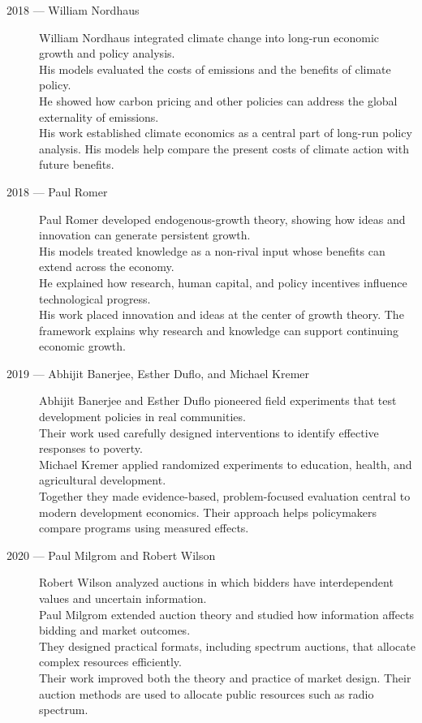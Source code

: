 \documentclass[12pt]{report}
\begin{document}
{\begin{description}
\item[2018 --- William Nordhaus]
William Nordhaus integrated climate change into long-run economic growth and policy analysis.\\
His models evaluated the costs of emissions and the benefits of climate policy.\\
He showed how carbon pricing and other policies can address the global externality of emissions.\\
His work established climate economics as a central part of long-run policy analysis. His models help compare the present costs of climate action with future benefits.

\item[2018 --- Paul Romer]
Paul Romer developed endogenous-growth theory, showing how ideas and innovation can generate persistent growth.\\
His models treated knowledge as a non-rival input whose benefits can extend across the economy.\\
He explained how research, human capital, and policy incentives influence technological progress.\\
His work placed innovation and ideas at the center of growth theory. The framework explains why research and knowledge can support continuing economic growth.

\item[2019 --- Abhijit Banerjee, Esther Duflo, and Michael Kremer]
Abhijit Banerjee and Esther Duflo pioneered field experiments that test development policies in real communities.\\
Their work used carefully designed interventions to identify effective responses to poverty.\\
Michael Kremer applied randomized experiments to education, health, and agricultural development.\\
Together they made evidence-based, problem-focused evaluation central to modern development economics. Their approach helps policymakers compare programs using measured effects.

\item[2020 --- Paul Milgrom and Robert Wilson]
Robert Wilson analyzed auctions in which bidders have interdependent values and uncertain information.\\
Paul Milgrom extended auction theory and studied how information affects bidding and market outcomes.\\
They designed practical formats, including spectrum auctions, that allocate complex resources efficiently.\\
Their work improved both the theory and practice of market design. Their auction methods are used to allocate public resources such as radio spectrum.


\end{description}}
\end{document}
